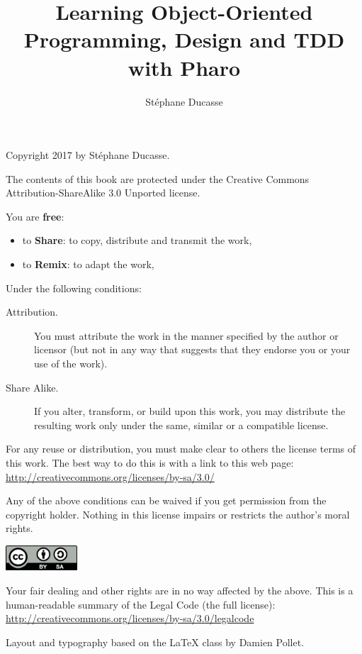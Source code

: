 \documentclass[10pt,twoside,english]{_support/latex/sbabook/sbabook}
\title{Learning Object-Oriented Programming, Design and TDD with Pharo}
\author{Stéphane Ducasse}
\begin{document}
\maketitle
\pagestyle{titlingpage}
\thispagestyle{titlingpage} %

\cleartoverso
{\small

  Copyright 2017 by Stéphane Ducasse.

  The contents of this book are protected under the Creative Commons
  Attribution-ShareAlike 3.0 Unported license.

  You are \textbf{free}:
  \begin{itemize}
  \item to \textbf{Share}: to copy, distribute and transmit the work,
  \item to \textbf{Remix}: to adapt the work,
  \end{itemize}

  Under the following conditions:
  \begin{description}
  \item[Attribution.] You must attribute the work in the manner specified by the
    author or licensor (but not in any way that suggests that they endorse you
    or your use of the work).
  \item[Share Alike.] If you alter, transform, or build upon this work, you may
    distribute the resulting work only under the same, similar or a compatible
    license.
  \end{description}

  For any reuse or distribution, you must make clear to others the
  license terms of this work. The best way to do this is with a link to
  this web page: \\
  \url{http://creativecommons.org/licenses/by-sa/3.0/}

  Any of the above conditions can be waived if you get permission from
  the copyright holder. Nothing in this license impairs or restricts the
  author's moral rights.

  \begin{center}
    \includegraphics[width=0.2\textwidth]{_support/latex/sbabook/CreativeCommons-BY-SA.pdf}
  \end{center}

  Your fair dealing and other rights are in no way affected by the
  above. This is a human-readable summary of the Legal Code (the full
  license): \\
  \url{http://creativecommons.org/licenses/by-sa/3.0/legalcode}

  \vfill

  Layout and typography based on the  \LaTeX{} class by Damien
  Pollet.
}
\end{document}
